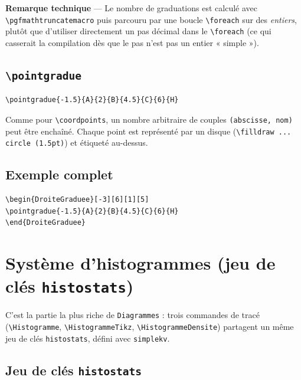 \documentclass[11pt,a4paper]{article}
\newcommand{\pkg}[1]{\texttt{#1}}
\newcommand{\cmdname}[1]{\texttt{\textbackslash#1}}
\begin{document}
\begin{noteDiag}
\textbf{Remarque technique} — Le nombre de graduations est calculé avec \texttt{\textbackslash pgfmathtruncatemacro} puis parcouru par une boucle \texttt{\textbackslash foreach} sur des \emph{entiers}, plutôt que d'utiliser directement un pas décimal dans le \texttt{\textbackslash foreach} (ce qui casserait la compilation dès que le pas n'est pas un entier « simple »).
\end{noteDiag}

\subsection{\cmdname{pointgradue}}

\begin{lstlisting}
\pointgradue{-1.5}{A}{2}{B}{4.5}{C}{6}{H}
\end{lstlisting}

Comme pour \cmdname{coordpoints}, un nombre arbitraire de couples \texttt{(abscisse, nom)} peut être enchaîné. Chaque point est représenté par un disque (\texttt{\textbackslash filldraw ... circle (1.5pt)}) et étiqueté au-dessus.

\subsection{Exemple complet}

\begin{lstlisting}
\begin{DroiteGraduee}[-3][6][1][5]
\pointgradue{-1.5}{A}{2}{B}{4.5}{C}{6}{H}
\end{DroiteGraduee}
\end{lstlisting}

\section{Système d'histogrammes (jeu de clés \texttt{histostats})}

C'est la partie la plus riche de \pkg{Diagrammes} : trois commandes de tracé (\cmdname{Histogramme}, \cmdname{HistogrammeTikz}, \cmdname{HistogrammeDensite}) partagent un même jeu de clés \texttt{histostats}, défini avec \pkg{simplekv}.

\subsection{Jeu de clés \texttt{histostats}}
\label{sec:histostats}
\end{document}
